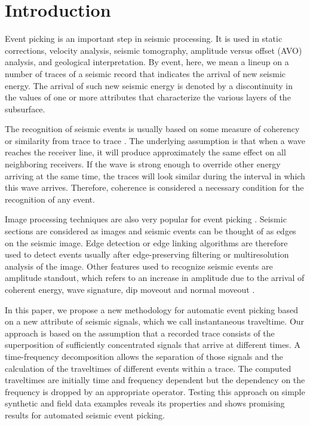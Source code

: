 \section{Introduction}
Event picking is an important step in seismic processing. It is used in static corrections, velocity analysis, seismic tomography, amplitude versus offset (AVO) analysis, and geological interpretation. By event, here, we mean a lineup on a number of traces of a seismic record that indicates the arrival of new seismic energy. The arrival of such new seismic energy is denoted by a discontinuity in the values of one or more  attributes that characterize the various layers of the subsurface.

The recognition of seismic events is usually based on some measure of coherency or similarity from trace to trace \citep{marfurt98,bienati98}. The underlying assumption is that when a wave reaches the receiver line, it will produce approximately the same effect on all neighboring receivers. If the wave is strong enough to override other energy arriving at the same time, the traces will look similar during the interval in which this wave arrives. Therefore, coherence is considered a necessary condition for the recognition of any event. 

Image processing techniques are also very popular for event picking \citep{bondar92}. Seismic sections are considered as images and seismic events can be thought of as edges on the seismic image. Edge detection or edge linking algorithms are therefore used to detect events usually after edge-preserving filtering \citep{bondar92} or multiresolution analysis \citep{maroni01} of the image. Other features used to recognize seismic events are amplitude standout, which refers to an increase in amplitude due to the arrival of coherent energy, wave signature, dip moveout and normal moveout \citep{garotta71}.


In this paper, we propose a new methodology for automatic event picking based on a new attribute of seismic signals, which we call instantaneous traveltime. Our approach is based on the assumption that a recorded trace consists of the superposition of sufficiently concentrated signals that arrive at different times. A time-frequency decomposition allows the separation of those signals and the calculation of the traveltimes of different events within a trace. The computed traveltimes are initially time and frequency dependent but the dependency on the frequency is dropped by an appropriate operator. Testing this approach on simple synthetic and field data examples reveals its properties and shows promising results for automated seismic event picking.



